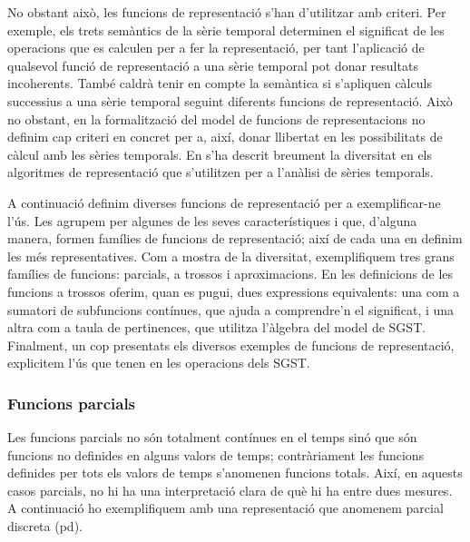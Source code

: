 No obstant això, les funcions de representació s'han d'utilitzar amb
criteri. Per exemple, els trets semàntics de la sèrie temporal
determinen el significat de les operacions que es calculen per a fer
la representació, per tant l'aplicació de qualsevol funció de
representació a una sèrie temporal pot donar resultats
incoherents. També caldrà tenir en compte la semàntica si s'apliquen
càlculs successius a una sèrie temporal seguint diferents funcions de
representació.  Això no obstant, en la formalització del model de
funcions de representacions no definim cap criteri en concret per a,
així, donar llibertat en les possibilitats de càlcul amb les sèries
temporals. En  s'ha descrit
breument la diversitat en els algoritmes de representació que
s'utilitzen per a l'anàlisi de sèries temporals.


A continuació definim diverses funcions de representació per a
exemplificar-ne l'ús. Les agrupem per algunes de les seves
característiques i que, d'alguna manera, formen famílies de funcions
de representació; així de cada una en definim les més representatives.
Com a mostra de la diversitat, exemplifiquem tres grans famílies de
funcions: parcials, a trossos i aproximacions.  En les definicions de
les funcions a trossos oferim, quan es pugui, dues expressions
equivalents: una com a sumatori de subfuncions contínues, que ajuda a
comprendre'n el significat, i una altra com a taula de pertinences,
que utilitza l'àlgebra del model de \gls{SGST}.
Finalment, un cop presentats els diversos
exemples de funcions de representació, explicitem l'ús que tenen en
les operacions dels \gls{SGST}.



\subsubsection{Funcions parcials}


Les funcions parcials no són totalment contínues en el temps sinó que
són funcions no definides en alguns valors de temps; contràriament les
funcions definides per tots els valors de temps s'anomenen funcions
totals. Així, en aquests casos parcials, no hi ha una interpretació
clara de què hi ha entre dues mesures.  A continuació ho exemplifiquem
amb una representació que anomenem parcial discreta (\gls{pd}).

